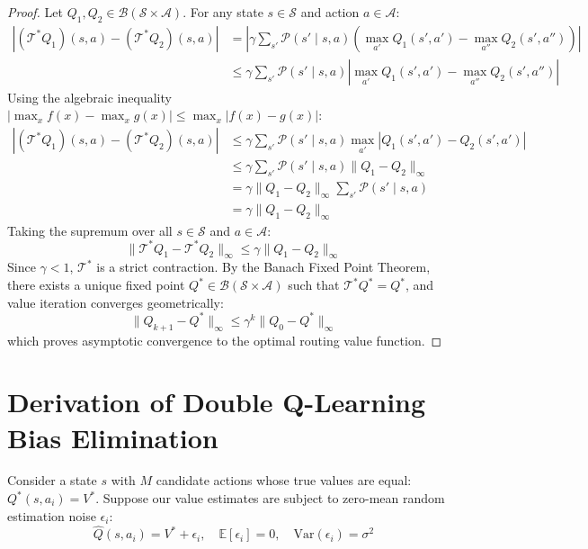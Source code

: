 \documentclass[12pt,a4paper,oneside]{report}
\begin{document}
\begin{proof}
Let $Q_1, Q_2 \in \mathcal{B}(\mathcal{S} \times \mathcal{A})$. For any state $s \in \mathcal{S}$ and action $a \in \mathcal{A}$:
\begin{align}
    |(\mathcal{T}^* Q_1)(s, a) - (\mathcal{T}^* Q_2)(s, a)| &= \left| \gamma \sum_{s'} \mathcal{P}(s' \mid s, a) \left( \max_{a'} Q_1(s', a') - \max_{a''} Q_2(s', a'') \right) \right| \nonumber \\
    &\le \gamma \sum_{s'} \mathcal{P}(s' \mid s, a) \left| \max_{a'} Q_1(s', a') - \max_{a''} Q_2(s', a'') \right|
\end{align}
Using the algebraic inequality $|\max_x f(x) - \max_x g(x)| \le \max_x |f(x) - g(x)|$:
\begin{align}
    |(\mathcal{T}^* Q_1)(s, a) - (\mathcal{T}^* Q_2)(s, a)| &\le \gamma \sum_{s'} \mathcal{P}(s' \mid s, a) \max_{a'} |Q_1(s', a') - Q_2(s', a')| \nonumber \\
    &\le \gamma \sum_{s'} \mathcal{P}(s' \mid s, a) \|Q_1 - Q_2\|_\infty \nonumber \\
    &= \gamma \|Q_1 - Q_2\|_\infty \sum_{s'} \mathcal{P}(s' \mid s, a) \nonumber \\
    &= \gamma \|Q_1 - Q_2\|_\infty
\end{align}
Taking the supremum over all $s \in \mathcal{S}$ and $a \in \mathcal{A}$:
\begin{equation}
    \|\mathcal{T}^* Q_1 - \mathcal{T}^* Q_2\|_\infty \le \gamma \|Q_1 - Q_2\|_\infty
\end{equation}
Since $\gamma < 1$, $\mathcal{T}^*$ is a strict contraction. By the Banach Fixed Point Theorem, there exists a unique fixed point $Q^* \in \mathcal{B}(\mathcal{S} \times \mathcal{A})$ such that $\mathcal{T}^* Q^* = Q^*$, and value iteration converges geometrically:
\begin{equation}
    \|Q_{k+1} - Q^*\|_\infty \le \gamma^k \|Q_0 - Q^*\|_\infty
\end{equation}
which proves asymptotic convergence to the optimal routing value function.
\end{proof}

\section{Derivation of Double Q-Learning Bias Elimination}
Consider a state $s$ with $M$ candidate actions whose true values are equal: $Q^*(s, a_i) = V^*$. Suppose our value estimates are subject to zero-mean random estimation noise $\epsilon_i$:
\begin{equation}
    \hat{Q}(s, a_i) = V^* + \epsilon_i, \quad \mathbb{E}[\epsilon_i] = 0, \quad \text{Var}(\epsilon_i) = \sigma^2
\end{equation}
\end{document}

